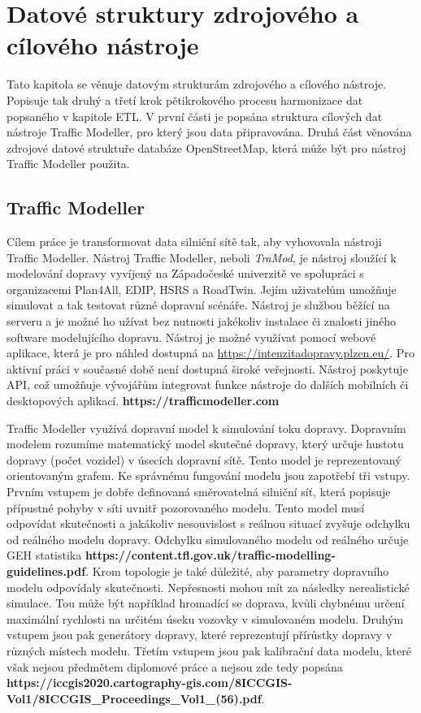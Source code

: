\chapter{Datové struktury zdrojového a cílového nástroje}
\label{chapter:datove_struktury_osm_tramod}

Tato kapitola se věnuje datovým strukturám zdrojového a cílového nástroje. Popisuje tak druhý a třetí krok pětikrokového procesu harmonizace dat popsaného v kapitole ETL. V první části je popsána struktura cílových dat nástroje Traffic Modeller, pro který jsou data připravována. Druhá část věnována zdrojové datové struktuře databáze OpenStreetMap, která může být pro nástroj Traffic Modeller použita. 

\section{Traffic Modeller}
\label{section:TraMod}

Cílem práce je transformovat data silniční sítě tak, aby vyhovovala nástroji Traffic Modeller. Nástroj Traffic Modeller, neboli \textit{TraMod}, je nástroj sloužící k modelování dopravy vyvíjený na Západočeské univerzitě ve spolupráci s organizacemi Plan4All, EDIP, HSRS a RoadTwin. Jejím uživatelům umožňuje simulovat a tak testovat různé dopravní scénáře. Nástroj je službou běžící na serveru a je možné ho užívat bez nutnosti jakékoliv instalace či znalosti jiného software modelujícího dopravu. Nástroj je možné využívat pomocí webové aplikace, která je pro náhled dostupná na \url{https://intenzitadopravy.plzen.eu/}. Pro aktivní práci v současné době není dostupná široké veřejnosti. Nástroj poskytuje API, což umožňuje vývojářům integrovat funkce nástroje do dalších mobilních či desktopových aplikací. \textbf{https://trafficmodeller.com}

Traffic Modeller využívá dopravní model k simulování toku dopravy. Dopravním modelem rozumíme matematický model skutečné dopravy, který určuje hustotu dopravy (počet vozidel) v úsecích dopravní sítě. Tento model je reprezentovaný orientovaným grafem. Ke správnému fungování modelu jsou zapotřebí tři vstupy. Prvním vstupem je dobře definovaná směrovatelná silniční síť, která popisuje přípustné pohyby v síti uvnitř pozorovaného modelu. Tento model musí odpovídat skutečnosti a jakákoliv nesouvislost s reálnou situací zvyšuje odchylku od reálného modelu dopravy. Odchylku simulovaného modelu od reálného určuje GEH statistika \textbf{https://content.tfl.gov.uk/traffic-modelling-guidelines.pdf}. Krom topologie je také důležité, aby parametry dopravního modelu odpovídaly skutečnosti. Nepřesnosti mohou mít za následky nerealistické simulace. Tou může být například hromadící se doprava, kvůli chybnému určení maximální rychlosti na určitém úseku vozovky v simulovaném modelu. Druhým vstupem jsou pak generátory dopravy, které reprezentují přírůstky dopravy v různých místech modelu. Třetím vstupem jsou pak kalibrační data modelu, které však nejsou předmětem diplomové práce a nejsou zde tedy popsána \textbf{https://iccgis2020.cartography-gis.com/8ICCGIS-Vol1/8ICCGIS\_Proceedings\_Vol1\_(56).pdf}. 

